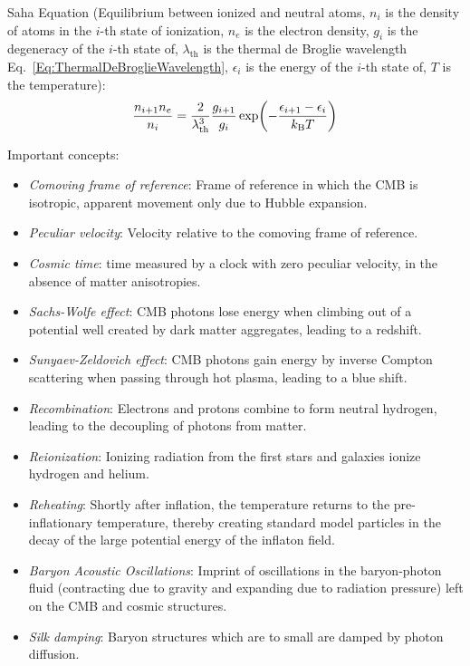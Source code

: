 		\noindent
		Saha Equation (Equilibrium between ionized and neutral atoms, $n_i$ is the density of atoms in the $i$-th state of ionization, $n_e$ is the electron density, $g_i$ is the degeneracy of the $i$-th state of, $\lambda_\text{th}$ is the thermal de Broglie wavelength Eq.~\ref{Eq:ThermalDeBroglieWavelength}, $\epsilon_i$ is the energy of the $i$-th state of, $T$ is the temperature):
		\begin{equation}
			\frac{n_{i+1} n_e}{n_i} = \frac{2}{\lambda_\text{th}^3} \frac{g_{i+1}}{g_i} \exp(- \frac{\epsilon_{i+1}-\epsilon_{i}}{k_{\text{B}} T})
		\end{equation}


		\noindent
		Important concepts:
		\begin{itemize}
			\item \emph{Comoving frame of reference}: Frame of reference in which the CMB is isotropic, apparent movement only due to Hubble expansion.
			\item \emph{Peculiar velocity}: Velocity relative to the comoving frame of reference.
			\item \emph{Cosmic time}: time measured by a clock with zero peculiar velocity, in the absence of matter anisotropies.
			\item \emph{Sachs-Wolfe effect}: CMB photons lose energy when climbing out of a potential well created by dark matter aggregates, leading to a redshift.
			\item \emph{Sunyaev-Zeldovich effect}: CMB photons gain energy by inverse Compton scattering when passing through hot plasma, leading to a blue shift.
			\item \emph{Recombination}: Electrons and protons combine to form neutral hydrogen, leading to the decoupling of photons from matter.
			\item \emph{Reionization}: Ionizing radiation from the first stars and galaxies ionize hydrogen and helium.
			\item \emph{Reheating}: Shortly after inflation, the temperature returns to the pre-inflationary temperature, thereby creating standard model particles in the decay of the large potential energy of the inflaton field.
			\item \emph{Baryon Acoustic Oscillations}: Imprint of oscillations in the baryon-photon fluid (contracting due to gravity and expanding due to radiation pressure) left on the CMB and cosmic structures.
			\item \emph{Silk damping}: Baryon structures which are to small are damped by photon diffusion.
		\end{itemize}


